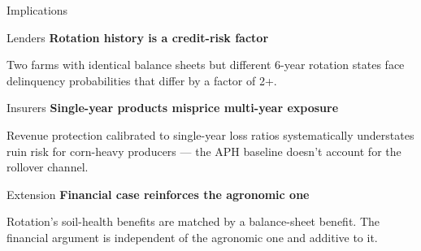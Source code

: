 \documentclass[notes, 10pt, aspectratio=169]{beamer}
\begin{document}

\begin{frame}{Implications}
\begin{block}{Lenders}
    \textbf{Rotation history is a credit-risk factor}

    Two farms with identical balance sheets but different 6-year rotation states face delinquency probabilities that differ by a factor of 2+.
\end{block}

\begin{block}{Insurers}
    \textbf{Single-year products misprice multi-year exposure}

    Revenue protection calibrated to single-year loss ratios systematically understates ruin risk for corn-heavy producers — the APH baseline doesn't account for the rollover channel.
\end{block}

\begin{block}{Extension}
    \textbf{Financial case reinforces the agronomic one}

    Rotation's soil-health benefits are matched by a balance-sheet benefit. The financial argument is independent of the agronomic one and additive to it.
\end{block}
\end{frame}
\end{document}
